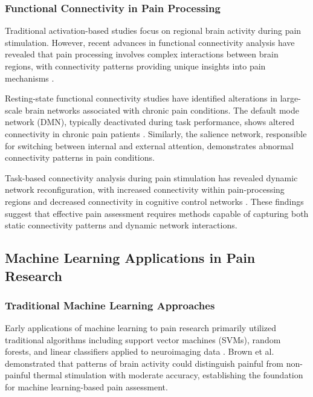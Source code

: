 \documentclass[10pt,journal,compsoc]{IEEEtran}
\begin{document}
\subsubsection{Functional Connectivity in Pain Processing}

Traditional activation-based studies focus on regional brain activity during pain stimulation. However, recent advances in functional connectivity analysis have revealed that pain processing involves complex interactions between brain regions, with connectivity patterns providing unique insights into pain mechanisms \cite{baliki2014brain}.

Resting-state functional connectivity studies have identified alterations in large-scale brain networks associated with chronic pain conditions. The default mode network (DMN), typically deactivated during task performance, shows altered connectivity in chronic pain patients \cite{greicius2003functional,fox2009default}. Similarly, the salience network, responsible for switching between internal and external attention, demonstrates abnormal connectivity patterns in pain conditions.

Task-based connectivity analysis during pain stimulation has revealed dynamic network reconfiguration, with increased connectivity within pain-processing regions and decreased connectivity in cognitive control networks \cite{woo2017quantifying}. These findings suggest that effective pain assessment requires methods capable of capturing both static connectivity patterns and dynamic network interactions.

\subsection{Machine Learning Applications in Pain Research}

\subsubsection{Traditional Machine Learning Approaches}

Early applications of machine learning to pain research primarily utilized traditional algorithms including support vector machines (SVMs), random forests, and linear classifiers applied to neuroimaging data \cite{brown2011towards}. Brown et al. demonstrated that patterns of brain activity could distinguish painful from non-painful thermal stimulation with moderate accuracy, establishing the foundation for machine learning-based pain assessment.
\end{document}
